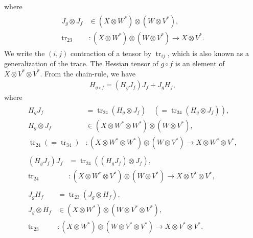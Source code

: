 \documentclass[a4paper]{article}
\newcommand{\jac}{J}
\newcommand{\hes}{H}
\newcommand{\parens}[1]{\left(#1\right)}
\newcommand{\tr}{\mathop{\mathrm{tr}}\nolimits}
\begin{document}
where
\begin{align}
    \begin{aligned}
        \jac_g \otimes \jac_f &\in \parens{X \otimes W^*} \otimes \parens{W \otimes V^*}, \\
        \tr_{23} & : \parens{X \otimes W^*} \otimes \parens{W \otimes V^*} \to
        X \otimes V^*.
    \end{aligned}
\end{align}
We write the $(i, j)$ contraction of a tensor by $\tr_{ij}$,
which is also known as a generalization of the trace.
The Hessian tensor of $g\circ f$ is an element of
$X \otimes V^* \otimes V^*$.
From the chain-rule, we have
\begin{align}
    \hes_{g\circ f} =
    \parens{\hes_g \jac_f} \jac_f +
    \jac_g \hes_f,
\end{align}
where
\begin{align}
    \begin{aligned}
        \hes_g \jac_f & = \tr_{24}\parens{\hes_g \otimes \jac_f}
        \quad\parens{= \tr_{34}\parens{\hes_g \otimes \jac_f}},\\
        \hes_g \otimes \jac_f &\in (X \otimes W^* \otimes W^*) \otimes (W \otimes V^*),\\
        \tr_{24}\parens{= \tr_{34}} &: (X \otimes W^* \otimes W^*) \otimes (W \otimes V^*) \to
        X \otimes W^* \otimes V^*,
    \end{aligned}
    \\[15pt]
    \begin{aligned}
        \parens{\hes_g \jac_f} \jac_f &= \tr_{24}\parens{\parens{\hes_g \jac_f} \otimes \jac_f},\\
        \tr_{24} &: \parens{X \otimes W^* \otimes V^*} \otimes \parens{W \otimes V^*}
        \to X \otimes V^* \otimes V^*,
    \end{aligned}\label{eq:hjj}
    \\[15pt]
    \begin{aligned}
        \jac_g \hes_f &= \tr_{23}\parens{\jac_g \otimes \hes_f},\\
        \jac_g \otimes \hes_f &\in (X \otimes W^*) \otimes (W \otimes V^* \otimes V^*),\\
        \tr_{23} &: (X \otimes W^*) \otimes (W \otimes V^* \otimes V^*) \to
        X \otimes V^* \otimes V^*.
    \end{aligned}\label{eq:jh}
\end{align}
\end{document}
